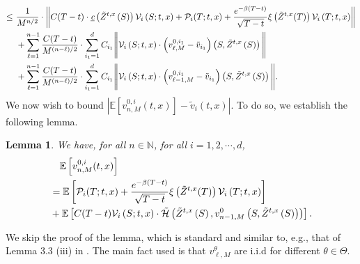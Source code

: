 \documentclass[11pt]{article}
\theoremstyle{definition}
\theoremstyle{plain}
\newtheorem{lemma}[assumption]{Lemma}
\newcommand{\E}{\mathbb{E}}
\newcommand{\N}{\mathbb{N}}
\newcommand{\cH}{{\cal H}}
\begin{document}
\begin{appendices}
\begin{align}
  \leq & ~ \frac{1}{M^{n/2}} \cdot \left\|C(T-t) \cdot \underbar{\em c}\left(\tilde{Z}^{t,x}\left(S\right)\right) \mathcal{V}_i\left(S; t,x\right)
  + \mathcal{P}_i(T; t,x) + \frac{e^{-\beta (T-t)}}{\sqrt{T-t}}\xi\left(\tilde{Z}^{t,x}(T)\right) \mathcal{V}_i\left(T; t,x\right)\right\| \label{eq:variance-1}\\
  &~ + \sum_{\ell=1}^{n-1} \frac{C(T-t)}{M^{(n-\ell)/2}} \cdot 
  \sum_{i_1=1}^d C_{i_1} \Bigg\| \mathcal{V}_i\left(S; t,x\right) \cdot \left(v^{0, i_1}_{\ell, M} - \tilde{v}_{i_1}\right)\left(S, \tilde{Z}^{t,x}\left(S\right)\right) \Bigg\| \label{eq:variance-2}\\
  &~ + \sum_{\ell=1}^{n-1} \frac{C(T-t)}{M^{(n-\ell)/2}} \cdot 
  \sum_{i_1=1}^d C_{i_1} \Bigg\| \mathcal{V}_i\left(S; t,x\right) \cdot \left(v^{0, i_1}_{\ell-1, M} - \tilde{v}_{i_1}\right)\left(S, \tilde{Z}^{t,x}\left(S\right)\right) \Bigg\|. \label{eq:variance-3}
  \end{align}
  We now wish to bound $\left|\E\left[v^{0,i}_{n,M}(t,x)\right] - \tilde{v}_i(t,x)\right|$. 
  To do so, we establish the following lemma.
  \begin{lemma}
  We have, for all $n \in \N$, for all $i = 1, 2, \cdots, d$, 
  \begin{align}
  & \quad \E\left[v^{0,i}_{n,M}(t,x)\right] \\
  & = \E\left[\mathcal{P}_i(T; t,x) + \frac{e^{-\beta (T-t)}}{\sqrt{T-t}}\xi\left(\tilde{Z}^{t,x}(T)\right) \mathcal{V}_i\left(T; t,x\right)\right] \\
  & + \E\left[C(T-t)\mathcal{V}_i\left(S; t,x\right)\cdot 
  \tilde \cH\left(\tilde{Z}^{t,x}\left(S\right), v^{0}_{n-1, M}\left(S, \tilde{Z}^{t,x}\left(S\right)\right) \right)\right].
  \end{align}
  \end{lemma}
  We skip the proof of the lemma, which is standard and similar to, e.g., that of Lemma 3.3 (iii) in \cite{HJK2022}. 
  The main fact used is that $v^\theta_{\ell, M}$ are i.i.d for different $\theta \in \Theta$.
  

\end{appendices}
\end{document}
